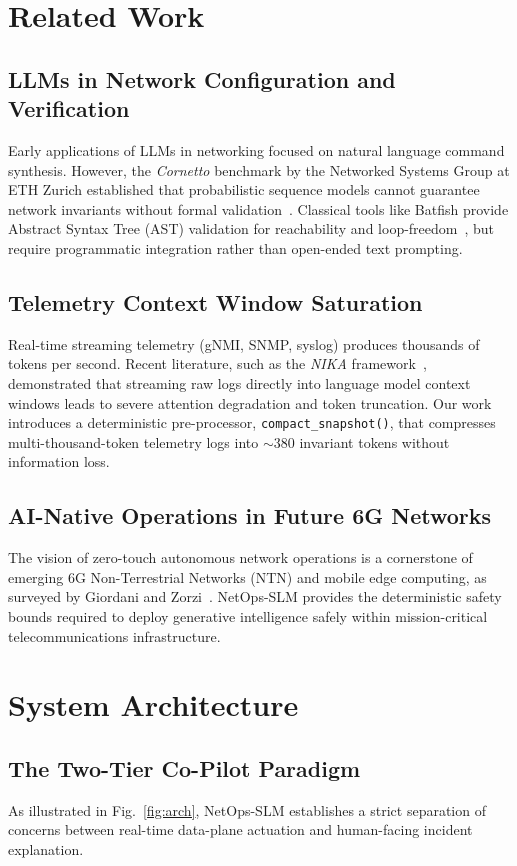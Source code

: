 \documentclass[conference]{IEEEtran}
\begin{document}
\section{Related Work}
\subsection{LLMs in Network Configuration and Verification}
Early applications of LLMs in networking focused on natural language command synthesis. However, the \textit{Cornetto} benchmark by the Networked Systems Group at ETH Zurich established that probabilistic sequence models cannot guarantee network invariants without formal validation~\cite{cornetto2024}. Classical tools like Batfish provide Abstract Syntax Tree (AST) validation for reachability and loop-freedom~\cite{fogel2015batfish}, but require programmatic integration rather than open-ended text prompting.

\subsection{Telemetry Context Window Saturation}
Real-time streaming telemetry (gNMI, SNMP, syslog) produces thousands of tokens per second. Recent literature, such as the \textit{NIKA} framework~\cite{nika2024}, demonstrated that streaming raw logs directly into language model context windows leads to severe attention degradation and token truncation. Our work introduces a deterministic pre-processor, \texttt{compact\_snapshot()}, that compresses multi-thousand-token telemetry logs into $\sim$380 invariant tokens without information loss.

\subsection{AI-Native Operations in Future 6G Networks}
The vision of zero-touch autonomous network operations is a cornerstone of emerging 6G Non-Terrestrial Networks (NTN) and mobile edge computing, as surveyed by Giordani and Zorzi~\cite{giordani2021non}. NetOps-SLM provides the deterministic safety bounds required to deploy generative intelligence safely within mission-critical telecommunications infrastructure.

\section{System Architecture}

\subsection{The Two-Tier Co-Pilot Paradigm}
As illustrated in Fig.~\ref{fig:arch}, NetOps-SLM establishes a strict separation of concerns between real-time data-plane actuation and human-facing incident explanation.
\end{document}
